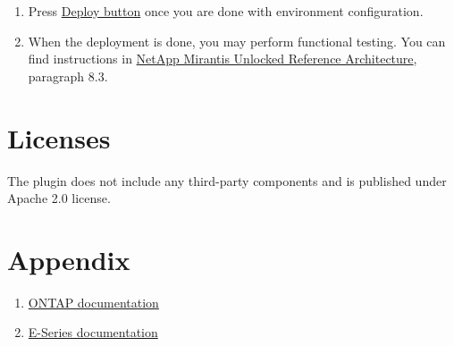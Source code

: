 \documentclass[letterpaper,10pt,english]{sphinxmanual}
\begin{document}
\begin{enumerate}
\item {} 
Press \href{https://docs.mirantis.com/openstack/fuel/fuel-8.0/user-guide.html\#deploy-changes}{Deploy button}
once you are done with environment configuration.

\item {} 
When the deployment is done, you may perform functional testing.
You can find instructions in \href{http://content.mirantis.com/Mirantis-NetApp-Reference-Architecture-Landing-Page.html}{NetApp Mirantis Unlocked Reference Architecture}, paragraph 8.3.

\end{enumerate}


\chapter{Licenses}
\label{licenses:licenses}\label{licenses::doc}
The plugin does not include any third-party
components and is published under Apache 2.0 license.


\chapter{Appendix}
\label{appendix:appendix}\label{appendix::doc}\begin{enumerate}
\item {} 
\href{http://mysupport.netapp.com/documentation/productlibrary/index.html?productID=30092}{ONTAP documentation}

\item {} 
\href{https://mysupport.netapp.com/info/web/ECMP1658252.html}{E-Series documentation}

\end{enumerate}



\renewcommand{\indexname}{Index}
\printindex
\end{document}
